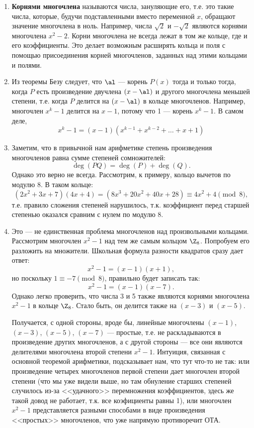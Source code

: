\begin{enumerate}
\item \textbf{Корнями многочлена} называются числа, зануляющие его, т.е. это такие числа, которые, будучи подставленными вместо переменной $x$, обращают значение многочлена в ноль. Например, числа $\sqrt 2$ и $-\sqrt 2$ являются корнями многочлена $x^2-2$. Корни многочлена не всегда лежат в том же кольце, где и его коэффициенты. Это делает возможным расширять кольца и поля с помощью присоединения корней многочленов, заданных над этими кольцами и полями.
\item Из теоремы Безу следует, что $\al$ --- корень $P(x)$ тогда и только тогда, когда $P$ есть произведение двучлена $(x-\al)$ и другого многочлена меньшей степени, т.е. когда $P$ делится на $(x-\al)$ в кольце многочленов. Например, многочлен $x^k-1$ делится на $x-1$, потому что 1 --- корень $x^k-1$. В самом деле,
$$
x^k-1=(x-1)(x^{k-1}+x^{k-2}+\dots+x+1)
$$

\item Заметим, что в привычной нам арифметике степень произведения многочленов равна сумме степеней сомножителей:
$$
\deg(PQ)=\deg(P)+\deg(Q).
$$
Однако это верно не всегда. Рассмотрим, к примеру, кольцо вычетов по модулю $8$. В таком кольце:
$$
(2x^2+3x+7)(4x+4) = (8x^3+20x^2+40x+28) \equiv 4x^2+4\pmod 8,
$$
т.е. правило сложения степеней нарушилось, т.к. коэффициент перед старшей степенью оказался сравним с нулем по модулю $8$.
\item Это --- не единственная проблема многочленов над произвольными кольцами. Рассмотрим многочлен $x^2-1$ над тем же самым кольцом $\Z_8$.
Попробуем его разложить на множители. Школьная формула разности квадратов сразу дает ответ:
$$
x^2-1=(x-1)(x+1),
$$
но поскольку $1\equiv -7\pmod 8$, правильно будет записать так:
$$
x^2-1=(x-1)(x-7).
$$
Однако легко проверить, что числа 3 и 5 также являются корнями многочлена $x^2-1$ в кольце $\Z_8$. Стало быть, он делится также на $(x-3)$ и $(x-5)$.

Получается, с одной стороны, вроде бы, линейные многочлены $(x-1)$, $(x-3)$, $(x-5)$, $(x-7)$ --- простые, т.е. не раскладываются в произведение других многочленов, а с другой стороны --- все они являются делителями многочлена второй степени $x^2-1$. Интуиция, связанная с основной теоремой арифметики, подсказывает нам, что тут что-то не так: или произведение четырех многочленов первой степени дает многочлен второй степени (что мы уже видели выше, но там обнуление старших степеней случилось из-за <<удачного>> перемножения коэффициентов, здесь же такой довод не работает, т.к. все коэфициенты равны 1), или многочлен $x^2-1$ представляется разными способами в виде произведения <<простых>> многочленов, что уже напрямую противоречит ОТА.


\end{enumerate}
